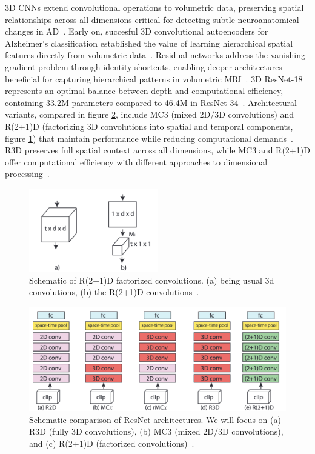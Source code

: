 \documentclass[12pt, a4paper]{article}
\begin{document}
3D CNNs extend convolutional operations to volumetric data, preserving spatial relationships across all dimensions critical for detecting subtle neuroanatomical changes in AD~\cite{ebrahimi2020introducing}. Early on, succesful 3D convolutional autoencoders for Alzheimer's classification established the value of learning hierarchical spatial features directly from volumetric data~\cite{payan2015predicting}. Residual networks address the vanishing gradient problem through identity shortcuts, enabling deeper architectures beneficial for capturing hierarchical patterns in volumetric MRI~\cite{wu20223d}. 3D ResNet-18 represents an optimal balance between depth and computational efficiency, containing 33.2M parameters compared to 46.4M in ResNet-34~\cite{ebrahimi2020introducing}. Architectural variants, compared in figure \ref{fig:cnn_architectures}, include MC3 (mixed 2D/3D convolutions) and R(2+1)D (factorizing 3D convolutions into spatial and temporal components, figure \ref{fig:2plus1D}) that maintain performance while reducing computational demands~\cite{wu20223d}. R3D preserves full spatial context across all dimensions, while MC3 and R(2+1)D offer computational efficiency with different approaches to dimensional processing~\cite{tran2018closer}.

\begin{figure}[htbp]
  \centering
  \includegraphics[width=0.5\textwidth]{figures/2plus1d.png}
  \caption{Schematic of R(2+1)D factorized convolutions. (a) being usual 3d convolutions, (b) the R(2+1)D convolutions~\cite{tran2018closer}.}
  \label{fig:2plus1D}
\end{figure}

\begin{figure}[htbp]
  \centering
  \includegraphics[width=\textwidth]{figures/res_net_archs.png}
  \caption{Schematic comparison of ResNet architectures. We will focus on (a) R3D (fully 3D convolutions), (b) MC3 (mixed 2D/3D convolutions), and (c) R(2+1)D (factorized convolutions)~\cite{tran2018closer}.}
  \label{fig:cnn_architectures}
\end{figure}
\end{document}
